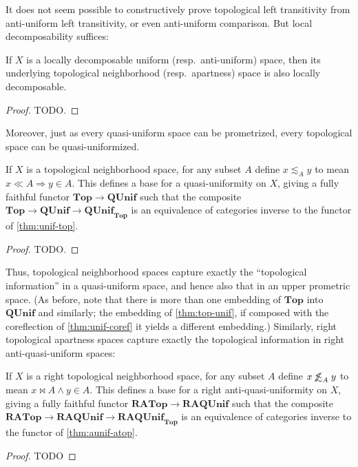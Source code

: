\documentclass{article}
\def\oapt{\mathrel{\!\not\,\not\lesssim}}
\def\leapx{\lesssim}
\def\ent#1{\leapx_{#1}}
\def\aent#1{\oapt_{#1}}
\let\implies\Rightarrow
\def\Top{\mathbf{Top}}
\def\RATop{\mathbf{RATop}}
\def\QUnif{\mathbf{QUnif}}
\def\RAQUnif{\mathbf{RAQUnif}}
\def\QUnifTop{\mathbf{QUnif}_{\mathbf{Top}}}
\def\RAQUnifTop{\mathbf{RAQUnif}_{\mathbf{Top}}}
\begin{document}
It does not seem possible to constructively prove topological left transitivity from anti-uniform left transitivity, or even anti-uniform comparison.
But local decomposability suffices:

\begin{thm}
  If $X$ is a locally decomposable uniform (resp.\ anti-uniform) space, then its underlying topological neighborhood (resp.\ apartness) space is also locally decomposable.
\end{thm}
\begin{proof}
  TODO.
\end{proof}

Moreover, just as every quasi-uniform space can be prometrized, every topological space can be quasi-uniformized.

\begin{thm}\label{thm:top-unif}
  If $X$ is a topological neighborhood space, for any subset $A$ define $x\ent A y$ to mean $x\ll A \implies y\in A$.
  This defines a base for a quasi-uniformity on $X$, giving a fully faithful functor $\Top \to \QUnif$ such that the composite $\Top \to \QUnif \to \QUnifTop$ is an equivalence of categories inverse to the functor of \cref{thm:unif-top}.
\end{thm}
\begin{proof}
  TODO.
\end{proof}

Thus, topological neighborhood spaces capture exactly the ``topological information'' in a quasi-uniform space, and hence also that in an upper prometric space.
(As before, note that there is more than one embedding of $\Top$ into $\QUnif$ and similarly; the embedding of \cref{thm:top-unif}, if composed with the coreflection of \cref{thm:unif-coref} it yields a different embedding.)
Similarly, right topological apartness spaces capture exactly the topological information in right anti-quasi-uniform spaces:

\begin{thm}\label{thm:atop-aunif}
  If $X$ is a right topological neighborhood space, for any subset $A$ define $x\aent A y$ to mean $x\bowtie A \land y\in A$.
  This defines a base for a right anti-quasi-uniformity on $X$, giving a fully faithful functor $\RATop \to \RAQUnif$ such that the composite $\RATop \to \RAQUnif \to \RAQUnifTop$ is an equivalence of categories inverse to the functor of \cref{thm:aunif-atop}.
\end{thm}
\begin{proof}
  TODO
\end{proof}
\end{document}
